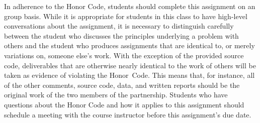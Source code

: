 In adherence to the Honor Code, students should complete this assignment on an group basis. While it is appropriate
for students in this class to have high-level conversations about the assignment, it is necessary to distinguish
carefully between the student who discusses the principles underlying a problem with others and the student who produces
assignments that are identical to, or merely variations on, someone else's work.  With the exception of the provided
source code, deliverables that are otherwise nearly identical to the work of others will be taken as evidence of
violating the \mbox{Honor Code}. This means that, for instance, all of the other comments, source code, data, and
written reports should be the original work of the two members of the partnership. Students who have questions about the
Honor Code and how it applies to this assignment should schedule a meeting with the course instructor before this
assignment's due date.


